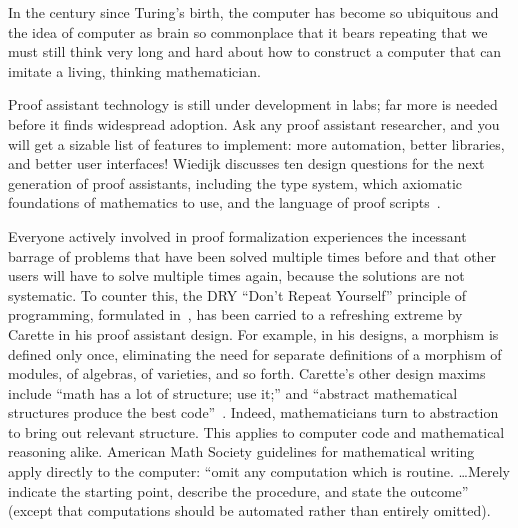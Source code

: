 \documentclass{llncs}
\begin{document}
In the century since Turing's birth, the computer has become so
ubiquitous and the idea of computer as brain so commonplace that it
bears repeating that we must still think very long and hard about how
to construct a computer that can imitate a living, thinking
mathematician.

Proof assistant technology is still under development in labs; far
more is needed before it finds widespread adoption.  Ask any proof
assistant researcher, and you will get a sizable list of features to
implement: more automation, better libraries, and better user
interfaces!  Wiedijk discusses ten design questions for the next
generation of proof assistants, including the type system, which
axiomatic foundations of mathematics to use, and the language of proof
scripts~\cite{Wie10}.

Everyone actively involved in proof formalization experiences the
incessant barrage of problems that have been solved multiple times
before and that other users will have to solve multiple times again,
because the solutions are not systematic.  To counter this, the DRY
``Don't Repeat Yourself'' principle of programming, formulated
in~\cite{PP00}, has been carried to a refreshing extreme by Carette in
his proof assistant design.  For example, in his designs, a morphism
is defined only once, eliminating the need for separate definitions of
a morphism of modules, of algebras, of varieties, and so forth.
Carette's other design maxims include ``math has a lot of structure;
use it;'' and ``abstract mathematical structures produce the best
code''~\cite{Car28p}.  Indeed, mathematicians turn to abstraction to
bring out relevant structure. This applies to computer code and
mathematical reasoning alike.  American Math Society guidelines for
mathematical writing apply directly to the computer: ``omit any
computation which is routine. \dots Merely indicate the starting
point, describe the procedure, and state the outcome''~\cite{DCFPS}
(except that computations should be automated rather than entirely
omitted).
\end{document}
